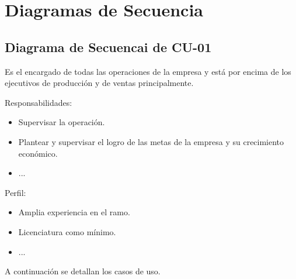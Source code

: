 \section{Diagramas de Secuencia}
\begin{Usuario}{\hypertarget{getenteOperaciones}{
\subsection{Diagrama de Secuencai de CU-01}}}{
	Es el encargado de todas las operaciones de la empresa y está por encima de los ejecutivos de producción y de ventas principalmente.
}
    \item[Responsabilidades:] \cdtEmpty
    \begin{itemize}
		\item Supervisar la operación.
		\item Plantear y supervisar el logro de las metas de la empresa y su crecimiento económico.
		\item ...
    \end{itemize}

	\item[Perfil:] \cdtEmpty
    \begin{itemize}
		\item Amplia experiencia en el ramo.
		\item Licenciatura como mínimo.
		\item ...
    \end{itemize}
\end{Usuario}


A continuación se detallan los casos de uso.






